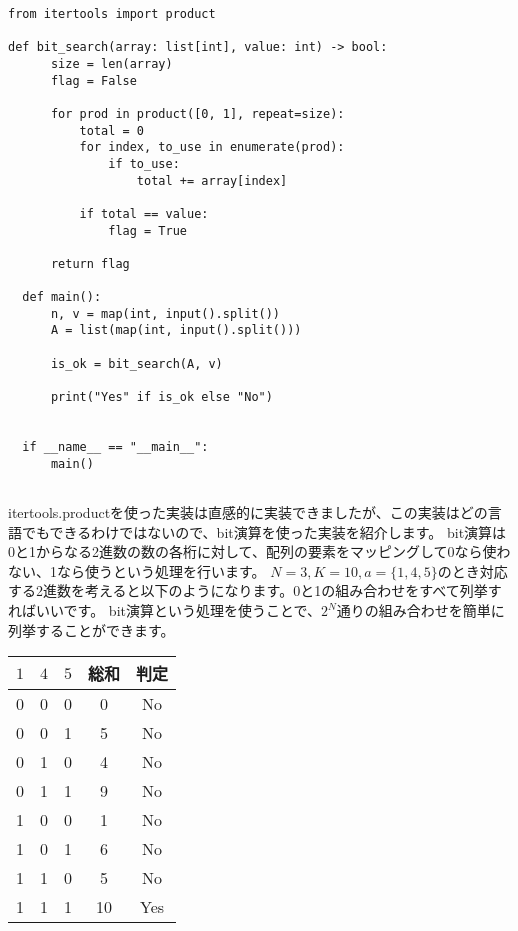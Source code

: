 \begin{lstlisting}[caption=itertools.productを使ったbit全探索, label=bit_search, frame=TRBL]
from itertools import product

def bit_search(array: list[int], value: int) -> bool:
      size = len(array)
      flag = False
      
      for prod in product([0, 1], repeat=size):
          total = 0
          for index, to_use in enumerate(prod):
              if to_use:
                  total += array[index]
          
          if total == value:
              flag = True
      
      return flag
  
  def main():
      n, v = map(int, input().split())
      A = list(map(int, input().split()))
      
      is_ok = bit_search(A, v)
      
      print("Yes" if is_ok else "No")
                  
  
  if __name__ == "__main__":
      main()
  
\end{lstlisting}

itertools.productを使った実装は直感的に実装できましたが、この実装はどの言語でもできるわけではないので、bit演算を使った実装を紹介します。
bit演算は0と1からなる2進数の数の各桁に対して、配列の要素をマッピングして0なら使わない、1なら使うという処理を行います。
$N = 3, K = 10, a = \{1, 4, 5\}$のとき対応する2進数を考えると以下のようになります。0と1の組み合わせをすべて列挙すればいいです。
bit演算という処理を使うことで、$2^N$通りの組み合わせを簡単に列挙することができます。

\begin{table}[h]
  \centering
  \begin{tabular}{|c|c|c|c|c|}
    \hline
    $1$ & $4$ & $5$ & 総和 & 判定 \\
    \hline
    0 & 0 & 0 & 0 & No \\
    0 & 0 & 1 & 5 & No \\
    0 & 1 & 0 & 4 & No \\
    0 & 1 & 1 & 9 & No \\
    1 & 0 & 0 & 1 & No \\
    1 & 0 & 1 & 6 & No \\
    1 & 1 & 0 & 5 & No \\
    1 & 1 & 1 & 10 & Yes \\
    \hline
  \end{tabular}
\end{table}

